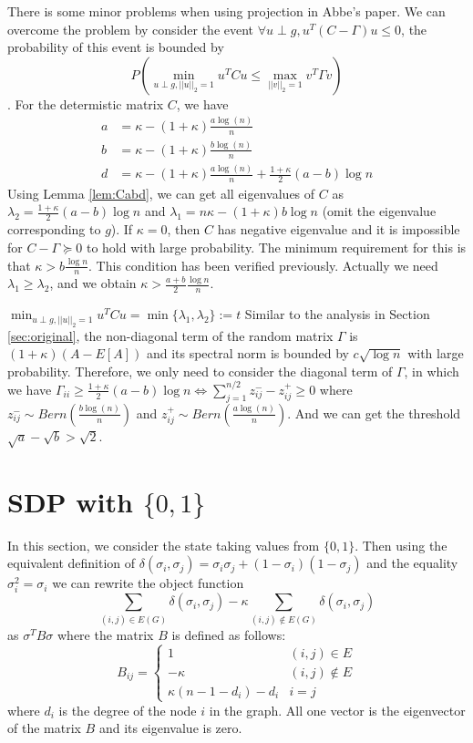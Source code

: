 \documentclass{article}
\newcommand{\A}{\frac{a \log(n)}{n}}
\newcommand{\B}{\frac{b \log(n)}{n}}
\begin{document}
There is some minor problems when using projection in Abbe's paper. We can overcome the problem by consider
the event $\forall u \perp g, u^T(C-\Gamma)u \leq 0$, the probability of this event is bounded by
$$P(\min_{u \perp g, ||u||_2=1} u^T C u \leq \max_{||v||_2=1} v^T \Gamma v)$$.
For the determistic matrix $C$, we have
\begin{align}
a &= \kappa - (1+\kappa) \A \\
b &= \kappa - (1+\kappa) \B \\
d & = \kappa - (1+\kappa) \A + \frac{1+\kappa}{2} (a-b) \log n
\end{align}
Using Lemma \ref{lem:Cabd}, we can get all eigenvalues of $C$ as $\lambda_2=\frac{1+\kappa}{2}(a-b)\log n $ and $\lambda_1=n\kappa - (1+\kappa)b\log n$
(omit the eigenvalue corresponding to $g$). If $\kappa = 0$, then $C$ has negative eigenvalue and it is impossible for
$C-\Gamma \succeq 0 $ to hold
with large probability. The minimum requirement for this is that $\kappa > b\frac{\log n}{n}$.
This condition has been verified previously. Actually we need $\lambda_1 \geq \lambda_2$, and we obtain
$\kappa > \frac{a+b}{2} \frac{\log n}{n}$.

$\min_{u \perp g, ||u||_2=1} u^T C u = \min\{\lambda_1, \lambda_2\} := t$
Similar to the analysis in Section \ref{sec:original}, the non-diagonal term of the random matrix $\Gamma$ is $(1+\kappa)(A-E[A])$ and its
spectral norm is bounded by $c\sqrt{\log n}$ with large probability.
Therefore, we only need to consider the diagonal term of $\Gamma$, in which we have
$\Gamma_{ii} \geq \frac{1+\kappa}{2}(a-b)\log n \iff \sum_{j=1}^{n/2} z^-_{ij} - z^+_{ij} \geq 0$
where $z^-_{ij} \sim Bern(\B)$ and $z^+_{ij} \sim Bern(\A)$.
And we can get the threshold $\sqrt{a} - \sqrt{b} > \sqrt{2}$.

\section{SDP with $\{0,1\}$}
In this section, we consider the state taking values from $\{0,1\}$. Then using
the equivalent definition of $\delta(\sigma_i, \sigma_j) = \sigma_i \sigma_j + (1-\sigma_i)(1-\sigma_j)$ and
the equality $\sigma_i^2 =\sigma_i$
we can rewrite the object function
\begin{equation}
\sum_{(i,j)\in E(G)} \delta(\sigma_i, \sigma_j) -
\kappa \sum_{(i,j) \not\in E(G)} \delta(\sigma_i, \sigma_j)
\end{equation}
as $\sigma^T B \sigma$ where the matrix $B$ is defined as follows:
\begin{equation}
B_{ij} = \begin{cases}
1 & (i,j) \in E \\
-\kappa & (i,j) \not\in E\\
\kappa (n-1 - d_i) - d_i & i=j
\end{cases}
\end{equation}
where $d_i$ is the degree of the node $i$ in the graph.
All one vector is the eigenvector of the  matrix $B$ and its eigenvalue is zero.
\end{document}
